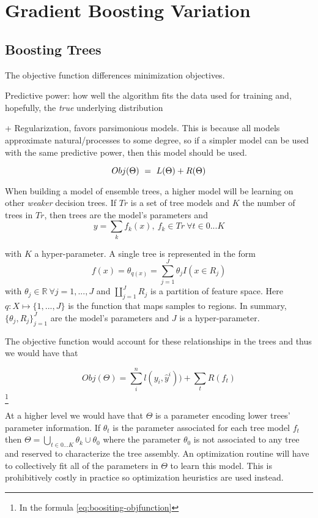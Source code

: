 \section{Gradient Boosting Variation}

\subsection{Boosting Trees    }

The objective function differences minimization objectives. 

Predictive power: how well the algorithm fits the data used for training and, hopefully, the \textit{true} underlying distribution

+ Regularization, favors parsimonious models. This is because all models approximate natural/processes to some degree, so if a simpler model can be used with the same predictive power, then this model should be used.  

\begin{equation} \label{eq:objFunction}
Obj(\Theta) \ = \ L(\Theta) + R(\Theta)
\\
\end{equation}

When building a model of ensemble trees, a higher model will be learning on other \textit{weaker} decision trees. If $Tr$ is a set of tree models and $K$ the number of trees in $Tr$, then trees are the model's parameters and
\[ y = \sum_k f_k(x) , \ f_k \in Tr \ \forall t \in {0...K}\]

with $K$ a hyper-parameter. A single tree is represented in the form 
\[
f(x) = \theta_{q(x)} = \sum_{j=1}^J \theta_j I(x \in  R_j)
\]
with $\theta_j \in \mathbb{R} \ \forall j = 1,...,J$ and $ \coprod_{j=1}^J R_j$ is a partition of feature space. Here $q : X \mapsto \{1,...,J\}$ is the function that maps samples to regions. In summary, $\{\theta_j, R_j\}_{j=1}^J$ are the model's parameters and $J$ is a hyper-parameter.

The objective function would account for these relationships in the trees and thus we would have that
 
\[ Obj(\Theta) = \sum_i^n l(y_i,\hat{y}^i))  +  \sum_t R(f_t) \] \label{eq:boositing-objfunction} \footnote{In the formula \ref{eq:boositing-objfunction} }
%    

At a higher level we would have that $\Theta$ is a parameter encoding lower trees' parameter information. If $\theta_t$ is the parameter associated for each tree model $f_t$ then $\Theta =  \bigcup_{t \in {0...K}} \theta_k  \cup \theta_0$ where the parameter $\theta_0$ is not associated to any tree and reserved to characterize the tree assembly. An optimization routine will have to collectively fit all of the parameters in $\Theta$ to learn this model. This is prohibitively costly in practice so optimization heuristics are used instead. 

